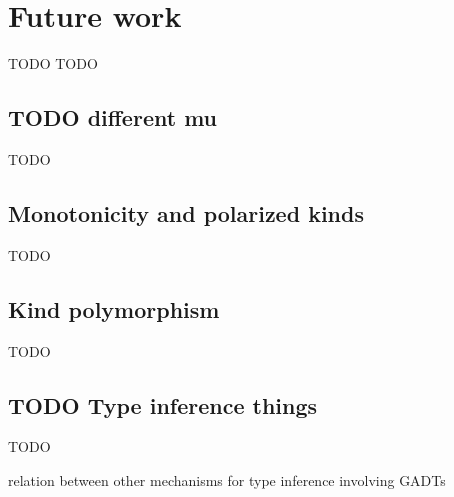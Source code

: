 \chapter{Future work}\label{ch:futwork} TODO
TODO

\section{TODO different mu}\label{sec:futwork:mu}
TODO

\section{Monotonicity and polarized kinds}
TODO

\section{Kind polymorphism}\label{sec:futwork:kindpoly}
TODO

\section{TODO Type inference things}
TODO

relation between other mechanisms for type inference involving GADTs


